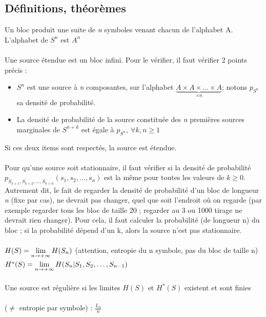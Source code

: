 \documentclass[11pt,a4paper]{article}
\renewcommand{\)}{\right)}
\renewcommand{\(}{\left(}
\begin{document}
\subsection{Définitions, théorèmes}
 Un bloc produit une suite de \textit{n} symboles venant chacun de l'alphabet A. L'alphabet de $S^n$ est $A^n$\\
\\
 Une source étendue est un bloc infini. Pour le vérifier, il faut vérifier 2 points précis :
\begin{itemize}
	\item   $S^n$ est une source à \textit{n} composantes, sur l’alphabet $\underbrace{A \times A \times \ldots \times A}_{\times n}$; notons $p_{S^n}$ sa densité de probabilité.
	\item La densité de probabilité de la source constituée des \textit{n} premières sources marginales de $S^{n+k}$ est égale à $p_{S^n},\ \forall k,n \geq 1$
\end{itemize}
Si ces deux items sont respectés, la source est étendue.\\
\\
 Pour qu'une source soit stationnaire, il faut vérifier si la densité de probabilité $p_{S_{k+1},S_{k+2},...,S_{k+n}}(s_1,s_2,...,s_n)$ est la même pour toutes les valeurs de $k\geq 0$. Autrement dit, le fait de regarder la densité de probabilité d'un bloc de longueur \textit{n} (fixe par cas), ne devrait pas changer, quel que soit l'endroit où on regarde (par exemple regarder tous les bloc de taille 20 ; regarder au 3 ou 1000 tirage ne devrait rien changer). Pour cela, il faut calculer la probabilité (de longueur n) du bloc ; si la probabilité dépend d'un k, alors la source n'est pas stationnaire.\\
\\
 $H(S) = \lim\limits_{n \to +\infty} H(S_n)$ (attention, entropie du n symbole, pas du bloc de taille n)\\
 $H^*(S) = \lim\limits_{n\to +\infty} H(S_n | S_1,S_2,\ldots,S_{n-1})$\\
\\
 Une source est régulière si les limites $H(S)$ et $H^*(S)$ existent et sont finies\\
\\
 ($\neq$ entropie par symbole) : $\frac{L_n}{n}$\\
\end{document}
